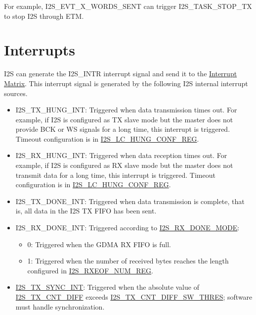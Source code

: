 \documentclass[main\_\_EN.tex]{subfiles}
\begin{document}
For example, I2S\_EVT\_X\_WORDS\_SENT can trigger I2S\_TASK\_STOP\_TX to stop I2S through ETM.



\section{Interrupts} \label{sec:i2s-interrupts}

\chipname{} I2S can generate the I2S\_INTR interrupt signal and send it to the \hyperref[mod:intmtrx]{Interrupt Matrix}. This interrupt signal is generated by the following I2S internal interrupt sources.

\begin{itemize}
\item \label{int:I2STXHUNGINT} I2S\_TX\_HUNG\_INT: Triggered when data transmission times out. For example, if I2S is configured as TX slave mode but the master does not provide BCK or WS signals for a long time, this interrupt is triggered. Timeout configuration is in \hyperref[regdesc:I2SLCHUNGCONFREG]{I2S\_LC\_HUNG\_CONF\_REG}.

\item \label{int:I2SRXHUNGINT} I2S\_RX\_HUNG\_INT: Triggered when data reception times out. For example, if I2S is configured as RX slave mode but the master does not transmit data for a long time, this interrupt is triggered. Timeout configuration is in \hyperref[regdesc:I2SLCHUNGCONFREG]{I2S\_LC\_HUNG\_CONF\_REG}.
\item \label{int:I2STXDONEINT} I2S\_TX\_DONE\_INT: Triggered when data transmission is complete, that is, all data in the I2S TX FIFO has been sent.
\item \label{int:I2SRXDONEINT} I2S\_RX\_DONE\_INT: Triggered according to \hyperref[fielddesc:I2SRXDONEMODE]{I2S\_RX\_DONE\_MODE}:
    \begin{itemize}
        \item 0: Triggered when the GDMA RX FIFO is full.
        \item 1: Triggered when the number of received bytes reaches the length configured in \hyperref[regdesc:I2SRXEOFNUMREG]{I2S\_RXEOF\_NUM\_REG}.
    \end{itemize}
\item \label{int:I2STXSYNCINT}\hyperref[int:I2STXSYNCINT]{I2S\_TX\_SYNC\_INT}: Triggered when the absolute value of \hyperref[fielddesc:I2STXCNTDIFF]{I2S\_TX\_CNT\_DIFF} exceeds \hyperref[fielddesc:I2STXCNTDIFFSWTHRES]{I2S\_TX\_CNT\_DIFF\_SW\_THRES}; software must handle synchronization.
\end{itemize}
\end{document}

